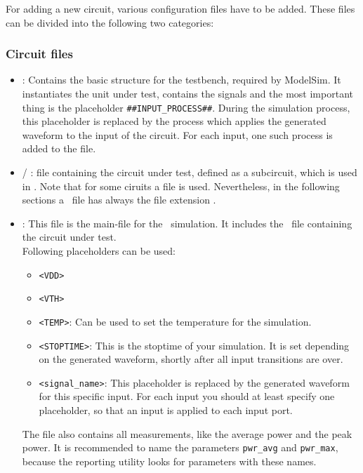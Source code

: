 For adding a new circuit, various configuration files have to be added.
These files can be divided into the following two categories:

\subsubsection{Circuit files}\label{sec:man-circuit-circuit-files}

\begin{itemize}
\item
  : Contains the basic structure for the testbench, required
  by ModelSim. It instantiates the unit under test, contains the signals
  and the most important thing is the placeholder   
  \lstinline|##INPUT_PROCESS##|. During the simulation process, this
  placeholder is replaced by the process which applies the generated
  waveform to the input of the circuit. For each input, one such process
  is added to the file.
\item
  \spfile / : file containing the circuit under test, defined as a 
  subcircuit, which is used in . Note that for some ciruits 
  a  file is used. Nevertheless, in the following sections a 
  \spice\ file has always the file extension \spfile.
\item
  : This file is the main-file for the \spice\ simulation. 
  It includes the \spfile\ file containing the circuit under test.\\
  Following placeholders can be used:

  \begin{itemize}
  \item \lstinline|<VDD>|
  \item \lstinline|<VTH>|
  \item \lstinline|<TEMP>|: Can be used to set the temperature for the 
  	simulation.
  \item \lstinline|<STOPTIME>|: This is the stoptime of your
    simulation. It is set depending on the generated waveform, shortly
    after all input transitions are over.
  \item \lstinline|<signal_name>|: This placeholder is replaced
    by the generated waveform for this specific input. For each input
    you should at least specify one placeholder, so that an input is
    applied to each input port.
  \end{itemize}

  The file also contains all measurements, like the average power and
  the peak power. It is recommended to name the parameters \lstinline|pwr_avg|
  and \lstinline|pwr_max|, because the reporting utility looks for parameters
  with these names.


\end{itemize}
